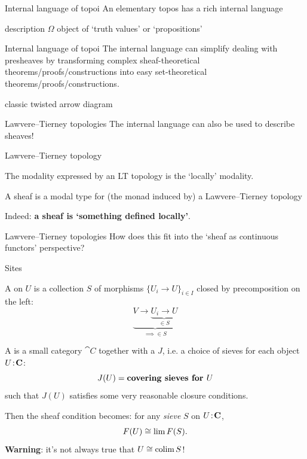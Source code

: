 \begin{frame}{Internal language of topoi}
	An elementary topos has a rich internal language

	description
	$\Omega$ object of `truth values' or `propositions'
\end{frame}

\begin{frame}{Internal language of topoi}
	The internal language can simplify dealing with presheaves by transforming complex sheaf-theoretical theorems/proofs/constructions into easy set-theoretical theorems/proofs/constructions.
	\begin{diagram*}
		 classic twisted arrow diagram
	\end{diagram*}
\end{frame}

\begin{frame}{Lawvere--Tierney topologies}
	The internal language can also be used to describe sheaves!
	\begin{definition}
		Lawvere--Tierney topology
	\end{definition}
	The modality expressed by an LT topology is the `locally' modality.
	\begin{definition}
		A sheaf is a modal type for (the monad induced by) a Lawvere--Tierney topology
	\end{definition}
	Indeed: \textbf{a sheaf is `something defined locally'}.
\end{frame}

\begin{frame}{Lawvere--Tierney topologies}
	How does this fit into the `sheaf as continuous functors' perspective?
\end{frame}

\begin{frame}{Sites}
	\vspace{-2ex}
	\begin{definition}
		A  on $U$ is a collection $S$ of morphisms $\{U_i \to U\}_{i \in I}$ closed by precomposition on the left:
		\begin{equation*}
			\underbrace{V \to \underbrace{U_i \to U}_{\in S}}_{\implies \in S}
		\end{equation*}
	\end{definition}
	\vspace{-5ex}
	\begin{definition}
		A  is a small category $\cat C$ together with a  $J$, i.e. a choice of sieves for each object $U \!:\! \mathbf{C}$:
		\begin{equation*}
			J(U) = \text{\bfseries covering sieves for $U$}
		\end{equation*}
		such that $J(U)$ satisfies some very reasonable closure conditions.
	\end{definition}
	Then the sheaf condition becomes: for any \emph{sieve} $S$ on $U \!:\! \mathbf{C}$,
	\begin{equation*}
		F(U) \overset{}{\cong} \lim F(S).
	\end{equation*}
	\textbf{Warning}: it's not always true that $U \overset{}{\cong} \operatorname*{colim} S$!
\end{frame}

